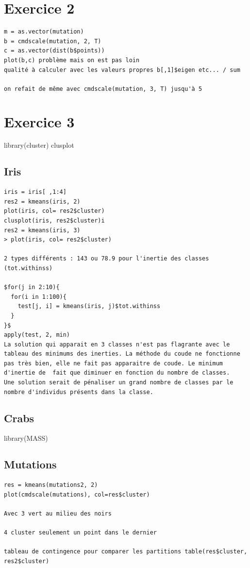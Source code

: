 \documentclass{article}\usepackage[]{graphicx}\usepackage[]{color}
\begin{document}
\section*{Exercice 2}

\begin{verbatim}
m = as.vector(mutation)
b = cmdscale(mutation, 2, T)
c = as.vector(dist(b$points))
plot(b,c) problème mais on est pas loin 
qualité à calculer avec les valeurs propres b[,1]$eigen etc... / sum 

on refait de même avec cmdscale(mutation, 3, T) jusqu'à 5 

\end{verbatim}

\section*{Exercice 3} 



library(cluster)
clusplot 
\subsection*{Iris}

\begin{verbatim}
iris = iris[ ,1:4]
res2 = kmeans(iris, 2)
plot(iris, col= res2$cluster)
clusplot(iris, res2$cluster)i
res2 = kmeans(iris, 3)
> plot(iris, col= res2$cluster)

2 types différents : 143 ou 78.9 pour l'inertie des classes (tot.withinss)

$for(j in 2:10){
  for(i in 1:100){
    test[j, i] = kmeans(iris, j)$tot.withinss
  }
}$
apply(test, 2, min)
La solution qui apparait en 3 classes n'est pas flagrante avec le tableau des minimums des inerties. La méthode du coude ne fonctionne pas très bien, elle ne fait pas apparaitre de coude. Le minimum d'inertie de  fait que diminuer en fonction du nombre de classes. 
Une solution serait de pénaliser un grand nombre de classes par le nombre d'individus présents dans la classe.
\end{verbatim}

\subsection*{Crabs}

library(MASS)


\subsection*{Mutations}
\begin{verbatim}
res = kmeans(mutations2, 2)
plot(cmdscale(mutations), col=res$cluster)

Avec 3 vert au milieu des noirs 

4 cluster seulement un point dans le dernier

tableau de contingence pour comparer les partitions table(res$cluster, res2$cluster)
\end{verbatim}
\end{document}
